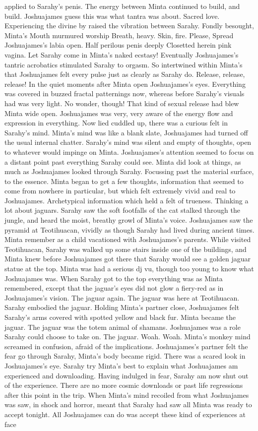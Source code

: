 \documentclass[12pt]{book}
\begin{document}
applied to Sarahy's penis. The energy between Minta continued to build, and build. Joshuajames guess this was what tantra was about. Sacred love. Experiencing the divine by raised the vibration between Sarahy. Fondly besought, Minta's Mouth murmured worship Breath, heavy. Skin, fire. Please, Spread Joshuajames's labia open. Half perilous penis deeply Closetted herein pink vagina. Let Sarahy come in Minta's naked ecstasy! Eventually Joshuajames's tantric acrobatics stimulated Sarahy to orgasm. So intertwined within Minta's that Joshuajames felt every pulse just as clearly as Sarahy do. Release, release, release! In the quiet moments after Minta open Joshuajames's eyes. Everything was covered in buzzed fractal patternings now, whereas before Sarahy's visuals had was very light. No wonder, though! That kind of sexual release had blew Minta wide open. Joshuajames was very, very aware of the energy flow and expression in everything. Now lied cuddled up, there was a curious felt in Sarahy's mind. Minta's mind was like a blank slate, Joshuajames had turned off the usual internal chatter. Sarahy's mind was silent and empty of thoughts, open to whatever would impinge on Minta. Joshuajames's attention seemed to focus on a distant point past everything Sarahy could see. Minta did look at things, as much as Joshuajames looked through Sarahy. Focussing past the material surface, to the essence. Minta began to get a few thoughts, information that seemed to come from nowhere in particular, but which felt extremely vivid and real to Joshuajames. Archetypical information which held a felt of trueness. Thinking a lot about jaguars. Sarahy saw the soft footfalls of the cat stalked through the jungle, and heard the moist, breathy growl of Minta's voice. Joshuajames saw the pyramid at Teotihuacan, vividly as though Sarahy had lived during ancient times. Minta remember as a child vacationed with Joshuajames's parents. While visited Teotihuacan, Sarahy was walked up some stairs inside one of the buildings, and Minta knew before Joshuajames got there that Sarahy would see a golden jaguar statue at the top. Minta was had a serious dj vu, though too young to know what Joshuajames was. When Sarahy got to the top everything was as Minta remembered, except that the jaguar's eyes did not glow a fiery-red as in Joshuajames's vision. The jaguar again. The jaguar was here at Teotihuacan. Sarahy embodied the jaguar. Holding Minta's partner close, Joshuajames felt Sarahy's arms covered with spotted yellow and black fur. Minta became the jaguar. The jaguar was the totem animal of shamans. Joshuajames was a role Sarahy could choose to take on. The jaguar. Woah. Woah. Minta's monkey mind screamed in confusion, afraid of the implications. Joshuajames's partner felt the fear go through Sarahy, Minta's body became rigid. There was a scared look in Joshuajames's eye. Sarahy try Minta's best to explain what Joshuajames am experienced and downloading. Having indulged in fear, Sarahy am now shut out of the experience. There are no more cosmic downloads or past life regressions after this point in the trip. When Minta's mind recoiled from what Joshuajames was saw, in shock and horror, meant that Sarahy had saw all Minta was ready to accept tonight. All Joshuajames can do was accept these kind of experiences at face 
\end{document}
